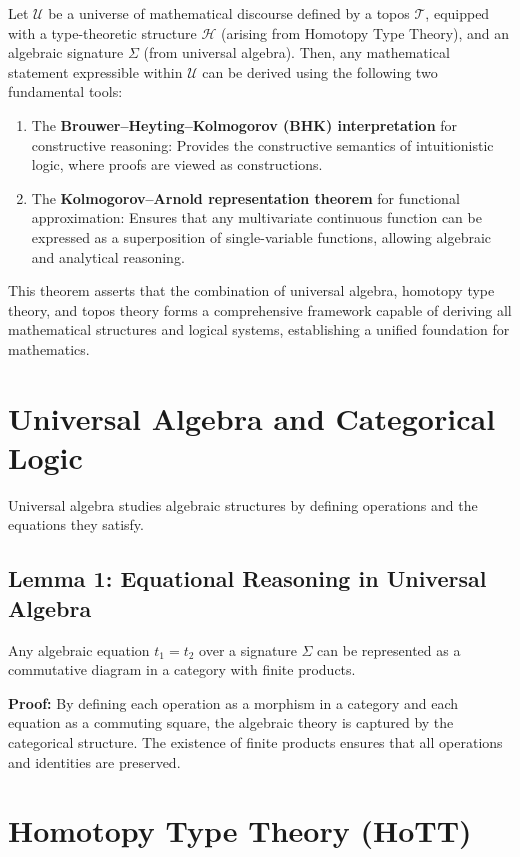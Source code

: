 \documentclass{article}
\begin{document}
Let \( \mathcal{U} \) be a universe of mathematical discourse defined by a topos \( \mathcal{T} \), equipped with a type-theoretic structure \( \mathcal{H} \) (arising from Homotopy Type Theory), and an algebraic signature \( \Sigma \) (from universal algebra). Then, any mathematical statement expressible within \( \mathcal{U} \) can be derived using the following two fundamental tools:

\begin{enumerate}
    \item The \textbf{Brouwer–Heyting–Kolmogorov (BHK) interpretation} for constructive reasoning: Provides the constructive semantics of intuitionistic logic, where proofs are viewed as constructions.
    \item The \textbf{Kolmogorov–Arnold representation theorem} for functional approximation: Ensures that any multivariate continuous function can be expressed as a superposition of single-variable functions, allowing algebraic and analytical reasoning.
\end{enumerate}

This theorem asserts that the combination of universal algebra, homotopy type theory, and topos theory forms a comprehensive framework capable of deriving all mathematical structures and logical systems, establishing a unified foundation for mathematics.

\section{Universal Algebra and Categorical Logic}

Universal algebra studies algebraic structures by defining operations and the equations they satisfy.

\subsection{Lemma 1: Equational Reasoning in Universal Algebra}
Any algebraic equation \( t_1 = t_2 \) over a signature \( \Sigma \) can be represented as a commutative diagram in a category with finite products.

\textbf{Proof:} By defining each operation as a morphism in a category and each equation as a commuting square, the algebraic theory is captured by the categorical structure. The existence of finite products ensures that all operations and identities are preserved.


\section{Homotopy Type Theory (HoTT)}
\end{document}

